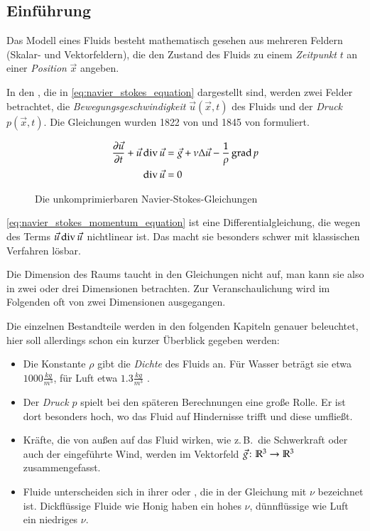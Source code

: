 \subsection{Einführung}

Das Modell eines Fluids besteht mathematisch gesehen aus mehreren Feldern
(Skalar- und Vektorfeldern), die den Zustand des Fluids zu einem
\emph{Zeitpunkt} $t$ an einer \emph{Position} $\vec{x}$ angeben.

In den , die in
\autoref{eq:navier_stokes_equation} dargestellt sind, werden zwei
Felder betrachtet, die \emph{Bewegungsgeschwindigkeit}
$\vec{u}(\vec{x},t)$ des Fluids und der \emph{Druck}
$p(\vec{x},t)$. Die Gleichungen wurden 1822 von
 und 1845 von  formuliert\cite{Muller2003}.

\begin{figure}
\begin{align}
\label{eq:navier_stokes_momentum_equation}
\frac{
	\partial
	\vec{u}
}
{
	\partial t
} +
\vec{u} \operatorname*{div} \vec{u}
& =
\vec{g} +
\nu \Delta \vec{u} -
\frac{
	1
}
{
	\rho
}
\operatorname*{grad} p
\\
\label{eq:navier_stokes_incompressibility_condition}
\operatorname*{div} \vec{u} & = 0
\end{align}
\caption{Die unkomprimierbaren Navier-Stokes-Gleichungen}
\label{eq:navier_stokes_equation}
\end{figure}

\autoref{eq:navier_stokes_momentum_equation} ist eine Differentialgleichung, die
wegen des Terms $\vec{u} \operatorname*{div} \vec{u}$ nichtlinear ist. Das macht sie
besonders schwer mit klassischen Verfahren lösbar.

Die Dimension des Raums taucht in den Gleichungen nicht auf, man kann sie also
in zwei oder drei Dimensionen betrachten. Zur Veranschaulichung wird im
Folgenden oft von zwei Dimensionen ausgegangen.

Die einzelnen Bestandteile werden in den folgenden Kapiteln genauer beleuchtet,
hier soll allerdings schon ein kurzer Überblick gegeben werden:

\begin{itemize}
\item
	Die Konstante $\rho$ gibt die \emph{Dichte} des Fluids an. Für Wasser beträgt
	sie etwa $1000 \frac{kg}{m^3}$, für Luft etwa $1.3
        \frac{kg}{m^3}$ \cite{Bridson2007}.
\item
	Der \emph{Druck} $p$ spielt bei den späteren Berechnungen eine große Rolle.
	Er ist dort besonders hoch, wo das Fluid auf Hindernisse
        trifft und diese umfließt.
\item
	Kräfte, die von außen auf das Fluid wirken, wie z.\,B.\ die Schwerkraft
	oder auch der eingeführte Wind, werden im Vektorfeld $\vec{g} \colon
	\mathbb{R}^3 \to \mathbb{R}^3$ zusammengefasst.
\item
	Fluide unterscheiden sich in ihrer 
	oder , die in der Gleichung mit $\nu$
	bezeichnet ist. Dickflüssige Fluide wie Honig haben ein hohes $\nu$,
	dünnflüssige wie Luft ein niedriges $\nu$.
\end{itemize}

